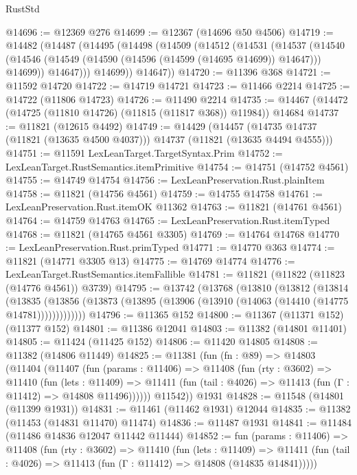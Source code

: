 \begin{lexlean}{RustStd}
\begin{coremodule}
@14696 := @12369 @276
@14699 := @12367 (@14696 @50 @4506)
@14719 := @14482
    (@14487
      (@14495
        (@14498
          (@14509
            (@14512
              (@14531
                (@14537
                  (@14540
                    (@14546 (@14549 (@14590 (@14596 (@14599 (@14695 @14699)) @14647))) @14699))
                  @14647)))
            @14699))
        @14647))
@14720 := @11396 @368
@14721 := @11592 @14720
@14722 := @14719 @14721
@14723 := @11466 @2214
@14725 := @14722 (@11806 @14723)
@14726 := @11490 @2214
@14735 := @14467 (@14472 (@14725 (@11810 @14726) (@11815 (@11817 @368)) @11984)) @14684
@14737 := @11821 (@12615 @4492)
@14749 := @14429
    (@14457 (@14735 @14737 (@11821 (@13635 @4500 @4037))) @14737 (@11821 (@13635 @4494 @4555)))
@14751 := @11591 LexLeanTarget.TargetSyntax.Prim
@14752 := LexLeanTarget.RustSemantics.itemPrimitive
@14754 := @14751 (@14752 @4561)
@14755 := @14749 @14754
@14756 := LexLeanPreservation.Rust.plainItem
@14758 := @11821 (@14756 @4561)
@14759 := @14755 @14758
@14761 := LexLeanPreservation.Rust.itemOK @11362
@14763 := @11821 (@14761 @4561)
@14764 := @14759 @14763
@14765 := LexLeanPreservation.Rust.itemTyped
@14768 := @11821 (@14765 @4561 @3305)
@14769 := @14764 @14768
@14770 := LexLeanPreservation.Rust.primTyped
@14771 := @14770 @363
@14774 := @11821 (@14771 @3305 @13)
@14775 := @14769 @14774
@14776 := LexLeanTarget.RustSemantics.itemFallible
@14781 := @11821 (@11822 (@11823 (@14776 @4561)) @3739)
@14795 := @13742
    (@13768
      (@13810
        (@13812
          (@13814
            (@13835
              (@13856 (@13873 (@13895 (@13906 (@13910 (@14063 (@14410 (@14775 @14781)))))))))))))
@14796 := @11365 @152
@14800 := @11367 (@11371 @152) (@11377 @152)
@14801 := @11386 @12041
@14803 := @11382 (@14801 @11401)
@14805 := @11424 (@11425 @152)
@14806 := @11420 @14805
@14808 := @11382 (@14806 @11449)
@14825 := @11381
    (fun (fn : @89) =>
    @14803
      (@11404
        (@11407
          (fun (params : @11406) =>
          @11408
            (fun (rty : @3602) =>
            @11410
              (fun (lets : @11409) =>
              @11411 (fun (tail : @4026) => @11413 (fun (Γ : @11412) => @14808 @11496))))))
        @11542))
    @1931
@14828 := @11548 (@14801 (@11399 @1931))
@14831 := @11461 (@11462 @1931) @12044
@14835 := @11382 (@11453 (@14831 @11470) @11474)
@14836 := @11487 @1931
@14841 := @11484 (@11486 @14836 @12047 @11442 @11444)
@14852 := fun (params : @11406) =>
  @11408
    (fun (rty : @3602) =>
    @11410
      (fun (lets : @11409) =>
      @11411 (fun (tail : @4026) => @11413 (fun (Γ : @11412) => @14808 (@14835 @14841)))))

\end{coremodule}
\end{lexlean}
